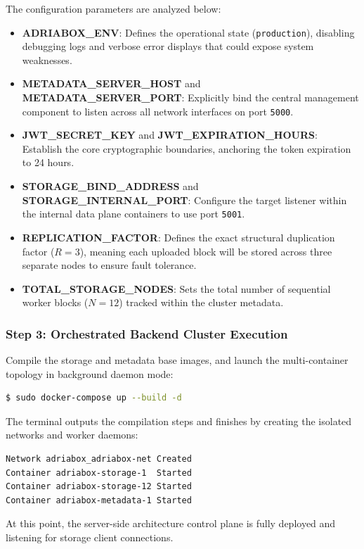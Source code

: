 The configuration parameters are analyzed below:
\begin{itemize}
    \item \textbf{ADRIABOX\_ENV}: Defines the operational state (\texttt{production}), disabling debugging logs and verbose error displays that could expose system weaknesses.
    \item \textbf{METADATA\_SERVER\_HOST} and \textbf{METADATA\_SERVER\_PORT}: Explicitly bind the central management component to listen across all network interfaces on port \texttt{5000}.
    \item \textbf{JWT\_SECRET\_KEY} and \textbf{JWT\_EXPIRATION\_HOURS}: Establish the core cryptographic boundaries, anchoring the token expiration to 24 hours.
    \item \textbf{STORAGE\_BIND\_ADDRESS} and \textbf{STORAGE\_INTERNAL\_PORT}: Configure the target listener within the internal data plane containers to use port \texttt{5001}.
    \item \textbf{REPLICATION\_FACTOR}: Defines the exact structural duplication factor ($R=3$), meaning each uploaded block will be stored across three separate nodes to ensure fault tolerance.
    \item \textbf{TOTAL\_STORAGE\_NODES}: Sets the total number of sequential worker blocks ($N=12$) tracked within the cluster metadata.
\end{itemize}

\subsubsection{Step 3: Orchestrated Backend Cluster Execution}
Compile the storage and metadata base images, and launch the multi-container topology in background daemon mode:
\begin{lstlisting}[language=bash, keepspaces=true, columns=flexible]
$ sudo docker-compose up --build -d
\end{lstlisting}
The terminal outputs the compilation steps and finishes by creating the isolated networks and worker daemons:
\begin{lstlisting}[basicstyle=\small\ttfamily, breaklines=true, frame=single, keepspaces=true, columns=flexible]
Network adriabox_adriabox-net Created
Container adriabox-storage-1  Started
Container adriabox-storage-12 Started
Container adriabox-metadata-1 Started
\end{lstlisting}

At this point, the server-side architecture control plane is fully deployed and listening for storage client connections.

